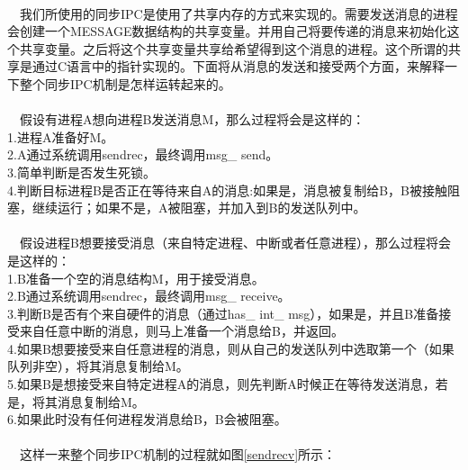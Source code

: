 \documentclass[UTF8,nofonts,cs4size]{ctexrep}
\begin{document}
\paragraph{}
\indent \ \ 
我们所使用的同步IPC是使用了共享内存的方式来实现的。需要发送消息的进程会创建一个MESSAGE数据结构的共享变量。并用自己将要传递的消息来初始化这个共享变量。之后将这个共享变量共享给希望得到这个消息的进程。这个所谓的共享是通过C语言中的指针实现的。下面将从消息的发送和接受两个方面，来解释一下整个同步IPC机制是怎样运转起来的。
\paragraph{}
\indent \ \ 假设有进程A想向进程B发送消息M，那么过程将会是这样的：
\\ \indent 1.进程A准备好M。
\\ \indent 2.A通过系统调用sendrec，最终调用msg\_ send。
\\ \indent 3.简单判断是否发生死锁。
\\ \indent 4.判断目标进程B是否正在等待来自A的消息:如果是，消息被复制给B，B被接触阻塞，继续运行；如果不是，A被阻塞，并加入到B的发送队列中。
\paragraph{}
\indent \ \ 假设进程B想要接受消息（来自特定进程、中断或者任意进程），那么过程将会是这样的：
\\ \indent 1.B准备一个空的消息结构M，用于接受消息。
\\ \indent 2.B通过系统调用sendrec，最终调用msg\_ receive。
\\ \indent 3.判断B是否有个来自硬件的消息（通过has\_ int\_ msg），如果是，并且B准备接受来自任意中断的消息，则马上准备一个消息给B，并返回。
\\ \indent 4.如果B想要接受来自任意进程的消息，则从自己的发送队列中选取第一个（如果队列非空），将其消息复制给M。
\\ \indent 5.如果B是想接受来自特定进程A的消息，则先判断A时候正在等待发送消息，若是，将其消息复制给M。
\\ \indent 6.如果此时没有任何进程发消息给B，B会被阻塞。
\paragraph{}
\indent \ \ 这样一来整个同步IPC机制的过程就如图\ref{sendrecv}所示：
\end{document}
